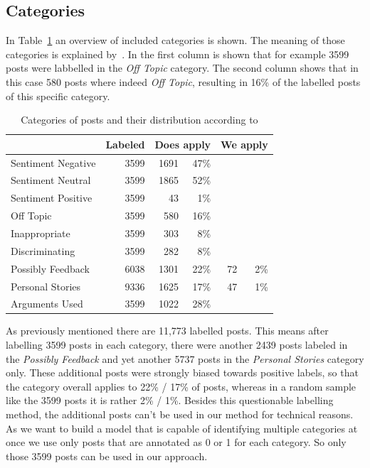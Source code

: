 \documentclass[11pt,a4paper]{article}
\begin{document}
\subsection{Categories}
In Table~\ref{tab:categories} an overview of included categories is shown. The meaning of those categories is explained by~.
In the first column is shown that for example 3599 posts were labbelled in the \textit{Off Topic} category. 
The second column shows that in this case 580 posts where indeed \textit{Off Topic}, resulting in 16\% of the labelled posts of this specific category. 

\begin{table}
	\centering\small
	\begin{tabular}{l r r r r r}
		& Labeled & \multicolumn{2}{c}{Does apply} & \multicolumn{2}{c}{We apply} \\
		\hline
		Sentiment Negative & 3599 & 1691 & 47\% \\
		Sentiment Neutral & 3599 & 1865 & 52\% \\
		Sentiment Positive & 3599 & 43 & 1\% \\
		Off Topic & 3599 & 580 & 16\% \\
		Inappropriate & 3599 & 303 & 8\%\\
		Discriminating & 3599 & 282 & 8\%\\
		Possibly Feedback & 6038 & 1301 & 22\% & 72 & 2\%\\
		Personal Stories & 9336 & 1625 & 17\% & 47 & 1\%\\
		Arguments Used & 3599 & 1022 & 28\%\\
	\end{tabular}
	\caption{Categories of posts and their distribution according to }
	\label{tab:categories}
\end{table}

As previously mentioned there are 11,773 labelled posts. This means after labelling 3599 posts in each category, there were another 2439 posts labeled in the \textit{Possibly Feedback} and yet another 5737 posts in the \textit{Personal Stories} category only.
These additional posts were strongly biased towards positive labels, so that the category overall applies to 22\% / 17\% of posts, whereas in a random sample like the 3599 posts it is rather 2\% / 1\%.
Besides this questionable labelling method, the additional posts can't be used in our method for technical reasons.
As we want to build a model that is capable of identifying multiple categories at once we use only posts that are annotated as 0 or 1 for each category.
So only those 3599 posts can be used in our approach.  
\end{document}
